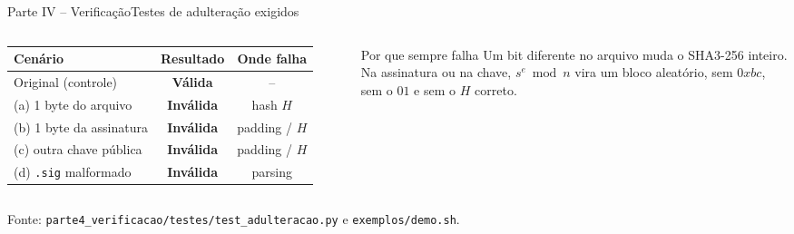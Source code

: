\documentclass[10pt,aspectratio=169]{beamer}
\newcommand{\source}[1]{\vfill{\tiny\color{gray}Fonte: #1}}
\begin{document}
\begin{frame}{Parte IV -- Verificação}{Testes de adulteração exigidos}
  \begin{columns}[T,onlytextwidth]
      \centering\small
      \begin{tabular}{lcc}
        \toprule
        \textbf{Cenário} & \textbf{Resultado} & \textbf{Onde falha} \\
        \midrule
        Original (controle) & {\color{unbgreen}\textbf{Válida}} & -- \\
        (a) 1 byte do arquivo & {\color{red}\textbf{Inválida}} & hash $H$ \\
        (b) 1 byte da assinatura & {\color{red}\textbf{Inválida}} & padding / $H$ \\
        (c) outra chave pública & {\color{red}\textbf{Inválida}} & padding / $H$ \\
        (d) \texttt{.sig} malformado & {\color{red}\textbf{Inválida}} & parsing \\
        \bottomrule
      \end{tabular}
      \begin{block}{Por que sempre falha}
        Um bit diferente no arquivo muda o SHA3-256 inteiro. Na assinatura ou na chave, $s^e \bmod n$ vira um bloco aleatório, sem $0xbc$, sem o $01$ e sem o $H$ correto.
      \end{block}
  \end{columns}
  \source{\texttt{parte4\_verificacao/testes/test\_adulteracao.py} e \texttt{exemplos/demo.sh}.}
\end{frame}

\end{document}
